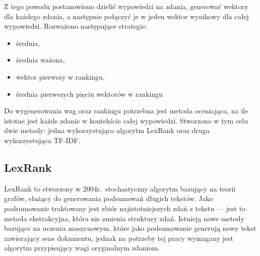 	Z tego powodu postanowiono dzielić wypowiedzi na zdania, generować wektory dla każdego zdania, a następnie połączyć je w jeden wektor wynikowy dla całej wypowiedzi.
	Rozważono następujące strategie:
	\begin{itemize}
		\item średnia,
		\item średnia ważona,
		\item wektor pierwszy w rankingu,
		\item średnia pierwszych pięciu wektorów w rankingu
	\end{itemize}
	Do wygenerowania wag oraz rankingu potrzebna jest metoda oceniająca, na ile istotne jest każde zdanie w kontekście całej wypowiedzi.
	Stworzono w tym celu dwie metody: jedna wykorzystująca algorytm LexRank oraz druga wykorzystująca TF-IDF\@.

	\subsection{LexRank}
		LexRank\cite{LexRank} to stworzony w 2004r.\ stochastyczny algorytm bazujący na teorii grafów, służący do generowania podsumowań długich tekstów.
		Jako podsumowanie traktowany jest zbiór najistotniejszych zdań z tekstu --- jest to metoda ekstrakcyjna, która nie zmienia struktury zdań.
		Istnieją nowe metody bazujące na uczeniu maszynowym, które jako podsumowanie generują nowy tekst zawierający sens dokumentu,
			jednak na potrzeby tej pracy wymagany jest algorytm przypisujący wagi oryginalnym zdaniom.
		
